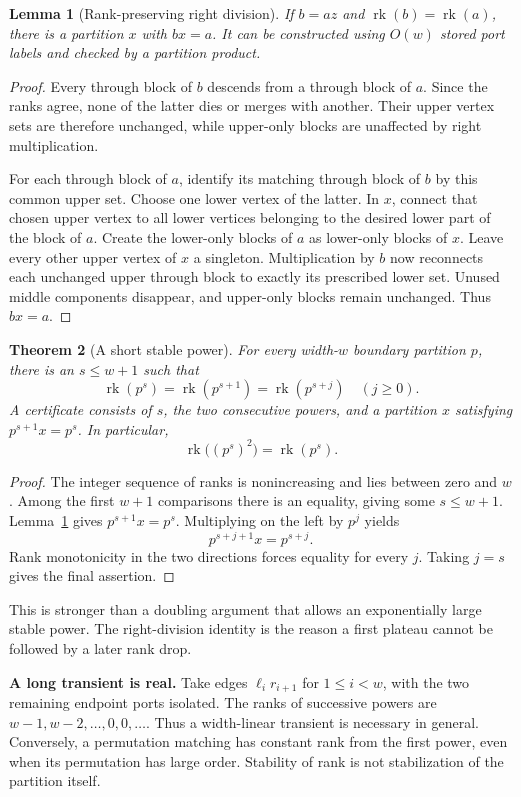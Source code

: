 \documentclass[11pt]{article}
\newtheorem{theorem}{Theorem}[section]
\newtheorem{lemma}[theorem]{Lemma}
\theoremstyle{remark}\newtheorem{remark}[theorem]{Remark}
\newcommand{\rk}{\operatorname{rk}}
\begin{document}
\begin{lemma}[Rank-preserving right division]\label{lem:division}
If $b=az$ and $\rk(b)=\rk(a)$, there is a partition $x$ with $bx=a$. It can be constructed using $O(w)$ stored port labels and checked by a partition product.
\end{lemma}
\begin{proof}
Every through block of $b$ descends from a through block of $a$. Since the ranks agree, none of the latter dies or merges with another. Their upper vertex sets are therefore unchanged, while upper-only blocks are unaffected by right multiplication.

For each through block of $a$, identify its matching through block of $b$ by this common upper set. Choose one lower vertex of the latter. In $x$, connect that chosen upper vertex to all lower vertices belonging to the desired lower part of the block of $a$. Create the lower-only blocks of $a$ as lower-only blocks of $x$. Leave every other upper vertex of $x$ a singleton. Multiplication by $b$ now reconnects each unchanged upper through block to exactly its prescribed lower set. Unused middle components disappear, and upper-only blocks remain unchanged. Thus $bx=a$.
\end{proof}

\begin{theorem}[A short stable power]\label{thm:stable}
For every width-$w$ boundary partition $p$, there is an $s\le w+1$ such that
\[
 \rk(p^s)=\rk(p^{s+1})=\rk(p^{s+j})\quad(j\ge0).
\]
A certificate consists of $s$, the two consecutive powers, and a partition $x$ satisfying $p^{s+1}x=p^s$. In particular,
\[
 \rk\bigl((p^s)^2\bigr)=\rk(p^s).
\]
\end{theorem}
\begin{proof}
The integer sequence of ranks is nonincreasing and lies between zero and $w$. Among the first $w+1$ comparisons there is an equality, giving some $s\le w+1$. Lemma~\ref{lem:division} gives $p^{s+1}x=p^s$. Multiplying on the left by $p^j$ yields
\[
 p^{s+j+1}x=p^{s+j}.
\]
Rank monotonicity in the two directions forces equality for every $j$. Taking $j=s$ gives the final assertion.
\end{proof}
This is stronger than a doubling argument that allows an exponentially large stable power. The right-division identity is the reason a first plateau cannot be followed by a later rank drop.

\noindent\textbf{A long transient is real.} Take edges $\ell_i r_{i+1}$ for $1\le i<w$, with the two remaining endpoint ports isolated. The ranks of successive powers are $w-1,w-2,\ldots,0,0,\ldots$. Thus a width-linear transient is necessary in general. Conversely, a permutation matching has constant rank from the first power, even when its permutation has large order. Stability of rank is not stabilization of the partition itself.
\end{document}
